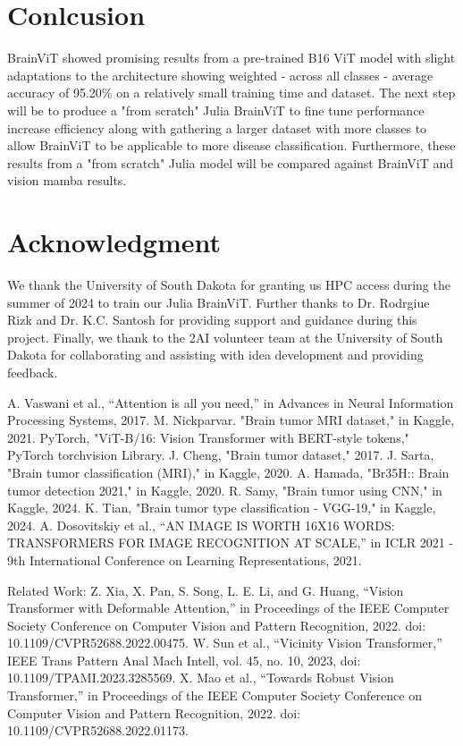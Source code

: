 \documentclass[conference]{IEEEtran}
\begin{document}
\section{Conlcusion}
BrainViT showed promising results from a pre-trained B16 ViT model with slight adaptations to the architecture showing weighted - across all classes - average accuracy of 95.20\% on a relatively small training time and dataset. The next step will be to produce a "from scratch" Julia BrainViT to fine tune performance increase efficiency along with gathering a larger dataset with more classes to allow BrainViT to be applicable to more disease classification. Furthermore, these results from a "from scratch" Julia model will be compared against BrainViT and vision mamba results.

\section*{Acknowledgment}
We thank the University of South Dakota for granting us HPC access during the summer of 2024 to train our Julia BrainViT. Further thanks to Dr. Rodrgiue Rizk and Dr. K.C. Santosh for providing support and guidance during this project. Finally, we thank to the 2AI volunteer team at the University of South Dakota for collaborating and assisting with idea development and providing feedback.

\begin{thebibliography}{00}
 A. Vaswani et al., “Attention is all you need,” in Advances in Neural Information Processing Systems, 2017.
 M. Nickparvar. "Brain tumor MRI dataset," in Kaggle, 2021. 
 PyTorch, "ViT-B/16: Vision Transformer with BERT-style tokens," PyTorch torchvision Library.
 J. Cheng, "Brain tumor dataset," 2017.
 J. Sarta, "Brain tumor classification (MRI)," in Kaggle, 2020.
 A. Hamada, "Br35H:: Brain tumor detection 2021," in Kaggle, 2020.
 R. Samy, "Brain tumor using CNN," in Kaggle, 2024.
 K. Tian, "Brain tumor type classification - VGG-19," in Kaggle, 2024.
 A. Dosovitskiy et al., “AN IMAGE IS WORTH 16X16 WORDS: TRANSFORMERS FOR IMAGE RECOGNITION AT SCALE,” in ICLR 2021 - 9th International Conference on Learning Representations, 2021.

Related Work:
 Z. Xia, X. Pan, S. Song, L. E. Li, and G. Huang, “Vision Transformer with Deformable Attention,” in Proceedings of the IEEE Computer Society Conference on Computer Vision and Pattern Recognition, 2022. doi: 10.1109/CVPR52688.2022.00475.
 W. Sun et al., “Vicinity Vision Transformer,” IEEE Trans Pattern Anal Mach Intell, vol. 45, no. 10, 2023, doi: 10.1109/TPAMI.2023.3285569.
 X. Mao et al., “Towards Robust Vision Transformer,” in Proceedings of the IEEE Computer Society Conference on Computer Vision and Pattern Recognition, 2022. doi: 10.1109/CVPR52688.2022.01173.
\end{thebibliography}
\end{document}
